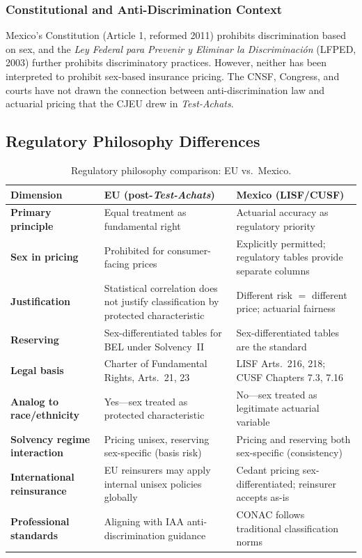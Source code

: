 \documentclass[12pt,a4paper]{article}
\begin{document}
\subsubsection{Constitutional and Anti-Discrimination Context}

Mexico's Constitution (Article 1, reformed 2011) prohibits discrimination based on sex, and the \emph{Ley Federal para Prevenir y Eliminar la Discriminaci\'{o}n} (LFPED, 2003) further prohibits discriminatory practices. However, neither has been interpreted to prohibit sex-based insurance pricing. The CNSF, Congress, and courts have not drawn the connection between anti-discrimination law and actuarial pricing that the CJEU drew in \emph{Test-Achats}.

\subsection{Regulatory Philosophy Differences}
\label{subsec:philosophy}

\begin{table}[H]
\centering
\caption{Regulatory philosophy comparison: EU vs.\ Mexico.}
\label{tab:philosophy}
\renewcommand{\arraystretch}{1.2}%
\begin{tabularx}{\textwidth}{p{3.2cm}XX}
\toprule
\textbf{Dimension} & \textbf{EU (post-\emph{Test-Achats})} & \textbf{Mexico (LISF/CUSF)} \\
\midrule
\textbf{Primary principle} &
  Equal treatment as fundamental right &
  Actuarial accuracy as regulatory priority \\
\textbf{Sex in pricing} &
  Prohibited for consumer-facing prices &
  Explicitly permitted; regulatory tables provide separate columns \\
\textbf{Justification} &
  Statistical correlation does not justify classification by protected characteristic &
  Different risk $=$ different price; actuarial fairness \\
\textbf{Reserving} &
  Sex-differentiated tables for BEL under Solvency~II &
  Sex-differentiated tables are the standard \\
\textbf{Legal basis} &
  Charter of Fundamental Rights, Arts.\ 21, 23 &
  LISF Arts.\ 216, 218; CUSF Chapters 7.3, 7.16 \\
\textbf{Analog to race/ethnicity} &
  Yes---sex treated as protected characteristic &
  No---sex treated as legitimate actuarial variable \\
\textbf{Solvency regime interaction} &
  Pricing unisex, reserving sex-specific (basis risk) &
  Pricing and reserving both sex-specific (consistency) \\
\textbf{International reinsurance} &
  EU reinsurers may apply internal unisex policies globally &
  Cedant pricing sex-differentiated; reinsurer accepts as-is \\
\textbf{Professional standards} &
  Aligning with IAA anti-discrimination guidance &
  CONAC follows traditional classification norms \\
\bottomrule
\end{tabularx}
\end{table}
\end{document}
